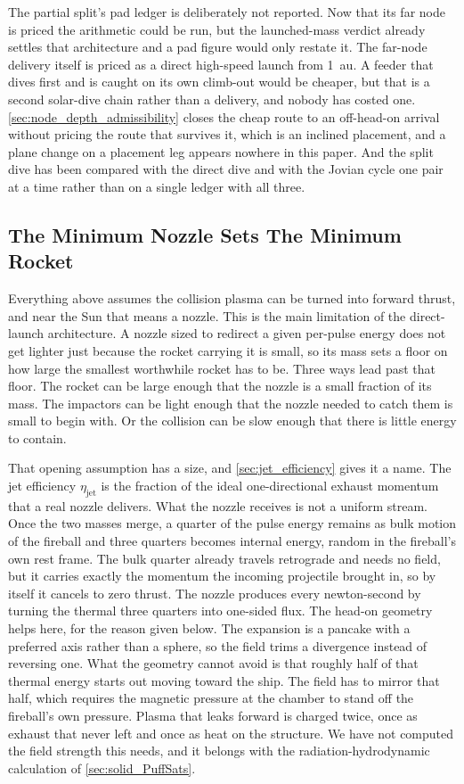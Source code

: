 \documentclass{article}
\begin{document}
The partial split's pad ledger is deliberately not reported. Now that its far node is priced the arithmetic could be run, but the launched-mass verdict already settles that architecture and a pad figure would only restate it. The far-node delivery itself is priced as a direct high-speed launch from \SI{1}{\astronomicalunit}. A feeder that dives first and is caught on its own climb-out would be cheaper, but that is a second solar-dive chain rather than a delivery, and nobody has costed one. \autoref{sec:node_depth_admissibility} closes the cheap route to an off-head-on arrival without pricing the route that survives it, which is an inclined placement, and a plane change on a placement leg appears nowhere in this paper. And the split dive has been compared with the direct dive and with the Jovian cycle one pair at a time rather than on a single ledger with all three.

\subsection{The Minimum Nozzle Sets The Minimum Rocket}\label{sec:minimum_nozzle}
Everything above assumes the collision plasma can be turned into forward thrust, and near the Sun that means a nozzle. This is the main limitation of the direct-launch architecture. A nozzle sized to redirect a given per-pulse energy does not get lighter just because the rocket carrying it is small, so its mass sets a floor on how large the smallest worthwhile rocket has to be. Three ways lead past that floor. The rocket can be large enough that the nozzle is a small fraction of its mass. The impactors can be light enough that the nozzle needed to catch them is small to begin with. Or the collision can be slow enough that there is little energy to contain.

That opening assumption has a size, and \autoref{sec:jet_efficiency} gives it a name. The jet efficiency $\eta_{\mathrm{jet}}$ is the fraction of the ideal one-directional exhaust momentum that a real nozzle delivers. What the nozzle receives is not a uniform stream. Once the two masses merge, a quarter of the pulse energy remains as bulk motion of the fireball and three quarters becomes internal energy, random in the fireball's own rest frame. The bulk quarter already travels retrograde and needs no field, but it carries exactly the momentum the incoming projectile brought in, so by itself it cancels to zero thrust. The nozzle produces every newton-second by turning the thermal three quarters into one-sided flux. The head-on geometry helps here, for the reason given below. The expansion is a pancake with a preferred axis rather than a sphere, so the field trims a divergence instead of reversing one. What the geometry cannot avoid is that roughly half of that thermal energy starts out moving toward the ship. The field has to mirror that half, which requires the magnetic pressure at the chamber to stand off the fireball's own pressure. Plasma that leaks forward is charged twice, once as exhaust that never left and once as heat on the structure. We have not computed the field strength this needs, and it belongs with the radiation-hydrodynamic calculation of \autoref{sec:solid_PuffSats}.
\end{document}
